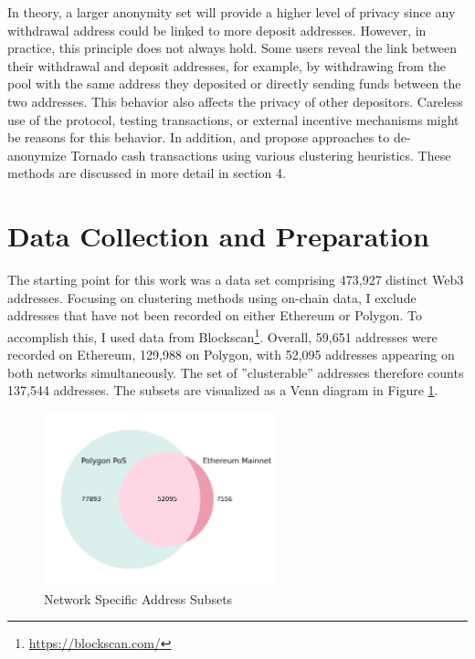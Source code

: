 \documentclass[12pt,a4paper,titlepage,oneside,english]{article}
\begin{document}
In theory, a larger anonymity set will provide a higher level of privacy since any withdrawal address could be linked to more deposit addresses. However, in practice, this principle does not always hold.
Some users reveal the link between their withdrawal and deposit addresses, for example, by withdrawing from the pool with the same address they deposited or directly sending funds between the two addresses. This behavior also affects the privacy of other depositors. Careless use of the protocol, testing transactions, or external incentive mechanisms might be reasons for this behavior. \newline
In addition, \cite{Beres2020} and \cite{wu2022tutela} propose approaches to de-anonymize Tornado cash transactions using various clustering heuristics. These methods are discussed in more detail in section 4.


\section{Data Collection and Preparation} 
The starting point for this work was a data set comprising 473,927 distinct Web3 addresses.
Focusing on clustering methods using on-chain data, I exclude addresses that have not been recorded on either Ethereum or Polygon. To accomplish this, I used data from Blockscan\footnote{\url{https://blockscan.com/}}. Overall, 59,651 addresses were recorded on Ethereum, 129,988 on Polygon, with 52,095 addresses appearing on both networks simultaneously. The set of ''clusterable'' addresses therefore counts 137,544 addresses. The subsets are visualized as a Venn diagram in Figure \ref{fig:Venn}.
 
\begin{figure}[h!]
	\centering
	\includegraphics[width=0.6\textwidth]{./figures/venn_diagram.png}
	\caption{Network Specific Address Subsets}
	\label{fig:Venn}
\end{figure} 
\end{document}
